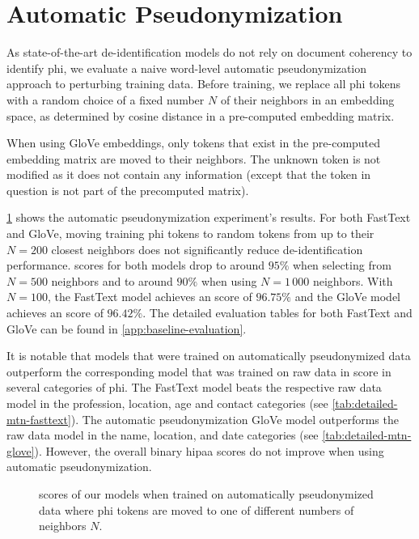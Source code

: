 
\section{Automatic Pseudonymization}\label{sec:automatic-pseudonymization}
%
As state-of-the-art de-identification models do not rely on document coherency to identify \ac{phi}, we evaluate a naive word-level automatic pseudonymization approach to perturbing training data.
%
Before training, we replace all \ac{phi} tokens with a random choice of a fixed number $N$ of their neighbors in an embedding space, as determined by cosine distance in a pre-computed embedding matrix.

%
When using GloVe embeddings, only tokens that exist in the pre-computed embedding matrix are moved to their neighbors.
%
The unknown token is not modified as it does not contain any information (except that the token in question is not part of the precomputed matrix).

%
\cref{fig:auto-pseudo} shows the automatic pseudonymization experiment's results. 
%
For both FastText and GloVe, moving training \ac{phi} tokens to random tokens from up to their $N=200$ closest neighbors does not significantly reduce de-identification performance.
%
\fone scores for both models drop to around $95\%$ when selecting from $N=500$ neighbors and to around $90\%$ when using $N=1\,000$ neighbors.
%
With $N=100$, the FastText model achieves an \fone score of $96.75\%$ and the GloVe model achieves an \fone score of $96.42\%$.
%
The detailed evaluation tables for both FastText and GloVe can be found in \cref{app:baseline-evaluation}.

%
It is notable that models that were trained on automatically pseudonymized data outperform the corresponding model that was trained on raw data in \fone score in several categories of \ac{phi}.
%
The FastText model beats the respective raw data model in the profession, location, age and contact categories (see \cref{tab:detailed-mtn-fasttext}).
%
The automatic pseudonymization GloVe model outperforms the raw data model in the name, location, and date categories (see \cref{tab:detailed-mtn-glove}).
%
However, the overall binary \ac{hipaa} \fone scores do not improve when using automatic pseudonymization.


\begin{figure}
    \centering
    
    \caption[De-identification with automatic pseudonymization]{\fone scores of our models when trained on automatically pseudonymized data where \ac{phi} tokens are moved to one of different numbers of neighbors $N$.}\label{fig:auto-pseudo}
\end{figure}